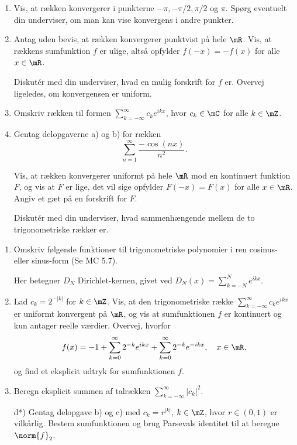 \begin{opg}
\begin{enumerate}
	\item Vis, at rækken konvergerer i punkterne $- \pi, -\pi/2, \pi/2$ og $\pi$. Spørg eventuelt din underviser, om man kan vise konvergens i andre punkter.

	\item Antag uden bevis, at rækken konvergerer punktvist på hele $\mR$. Vis, at rækkens sumfunktion $f$ er ulige, altså opfylder $f(-x)=-f(x)$ for alle $x \in \mR$. 
	
	Diskutér med din underviser, hvad en mulig forskrift for $f$ er. Overvej ligeledes, om konvergensen er uniform.
	
	\item Omskriv rækken til formen $\sum_{k=-\infty}^{\infty} c_k e^{ikx}$, hvor $c_k\in\mC$ for alle $k\in\mZ$.
	
	\item Gentag delopgaverne a) og b) for rækken
	$$ \sum_{n=1}^\infty \frac{-\cos(n x)}{n^2}.$$
	
    Vis, at rækken konvergerer uniformt på hele $\mR$ mod en kontinuert funktion $F$, og vis at $F$ er lige, det vil sige opfylder $F(-x)=F(x)$ for alle $x \in \mR$. Angiv et gæt på en forskrift for $F$.

    Diskutér med din underviser, hvad sammenhængende mellem de to trigonometriske rækker er.
\end{enumerate}
\end{opg}

\begin{opg}\hfill
\begin{enumerate}
	\item Omskriv følgende funktioner til trigonometriske polynomier
	i ren cosinus- eller sinus-form (Se MC 5.7).
	\begin{tasks}{3}
		\item $D_3(x)$
		\item $|D_3(x)|^2$
		\item $\cos(x)^3$
	\end{tasks}
	Her betegner $D_N$ Dirichlet-kernen, givet ved $D_N(x)=\sum_{k=-N}^Ne^{ikx}$.
	
	\item Lad $c_k = 2^{-|k|}$ for $k \in \mZ$. Vis, at den trigonometriske række $ \sum_{k=-\infty}^\infty c_k e^{ik x}$ er uniformt konvergent på $\mR$, og vis at sumfunktionen $f$ er kontinuert og kun antager reelle værdier. Overvej, hvorfor 
	$$ f(x) = -1+ \sum_{k=0}^\infty 2^{-k} e^{ikx} +  \sum_{k=0}^\infty 2^{-k} e^{-ikx}, \quad x \in \mR, $$
	og find et eksplicit udtryk for sumfunktionen $f$.
	
    \item Beregn eksplicit summen af talrækken $\sum_{k=-\infty}^\infty |c_k|^2$.
    
	\item[d*)] Gentag delopgave b) og c) med $c_k = r^{\lvert k \rvert}$, $k \in \mZ$, hvor $r \in (0,1)$ er vilkårlig. Bestem sumfunktionen og brug Parsevals identitet til at beregne $\norm{f}_2$. 
\end{enumerate}
\end{opg}

